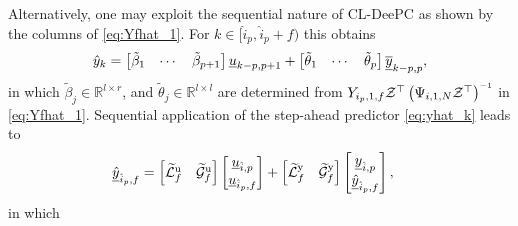 Alternatively, one may exploit the sequential nature of \ac{CL-DeePC} as shown by the columns of \eqref{eq:Yfhat_1}. For $k\in[\hat{i}_p,\hat{i}_p+f)$ this obtains
\begin{align}\label{eq:yhat_k}
    \hat{y}_{k} = \begin{bmatrix} \tilde{\beta}_1 & \cdots & \tilde{\beta}_{p+1} \end{bmatrix} \datavec{u}{k-p,p+1} + \begin{bmatrix} \tilde{\theta}_1 & \cdots & \tilde{\theta}_{p} \end{bmatrix} \datavec{\overline{y}}{k-p,p},%
\end{align}
in which $\tilde{\beta}_j\in\mathbb{R}^{l\times r}$, and $\tilde{\theta}_j\in\mathbb{R}^{l\times l}$ are determined from $Y_{i_p,1,f}\mathcal{Z}^\top\left(\Psi_{i,1,N}\mathcal{Z}^\top\right)\inv$ in \eqref{eq:Yfhat_1}. Sequential application of the step-ahead predictor \eqref{eq:yhat_k} leads to
\begin{align}\label{eq:Sequential1}
    \underline{\hat{y}}_{\hat{i}_p,f} &=
    \begin{bmatrix}
        \widetilde{\mathcal{L}}^\mathrm{u}_f & \widetilde{\mathcal{G}}^\mathrm{u}_f 
    \end{bmatrix}    
    \begin{bmatrix}
        \underline{u}_{\hat{i},p}\\
        \underline{u}_{\hat{i}_p,f}
    \end{bmatrix}+
    \begin{bmatrix}
        \widetilde{\mathcal{L}}^\mathrm{y}_f & \widetilde{\mathcal{G}}^\mathrm{y}_f 
    \end{bmatrix}    
    \begin{bmatrix}
        \underline{y}_{\hat{i},p}\\
        \underline{\hat{y}}_{\hat{i}_p,f}
    \end{bmatrix},
\end{align}
in which
